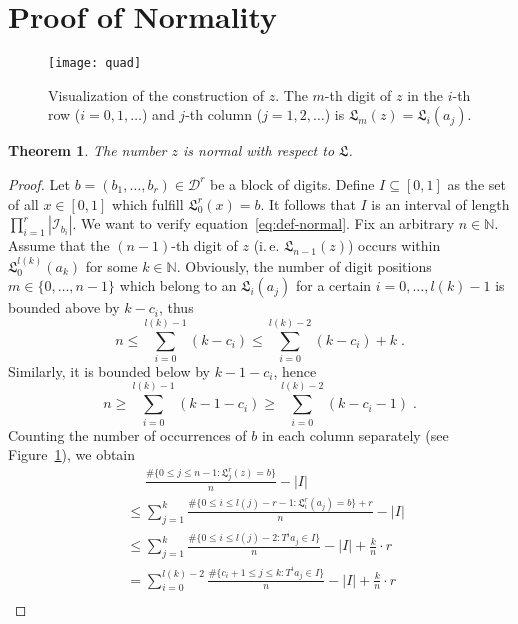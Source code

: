\documentclass{amsart}
\newtheorem{theorem}{Theorem}
\theoremstyle{definition}
\theoremstyle{remark}
\begin{document}
\section{Proof of Normality}\label{sect:proof}
\begin{figure}
\centering\texttt{[image: quad]}
\caption{Visualization of the construction of $z$. The $m$-th digit of $z$ in the $i$-th row ($i=0,1,\dots$) and $j$-th column ($j=1,2,\dots$) is ${\ensuremath{\mathfrak L}}_m(z)={\ensuremath{\mathfrak L}}_i(a_j)$.}\label{fig:quad}
\end{figure}
\begin{theorem}
The number $z$ is normal with respect to ${\ensuremath{\mathfrak L}}$.
\end{theorem}
\begin{proof}
Let $b=(b_1,\dots,b_r)\in{\ensuremath{\mathcal D}}^r$ be a block of digits.
Define $I\subseteq[0,1]$ as the set of all $x\in[0,1]$ which fulfill ${\ensuremath{\mathfrak L}}_0^r(x)=b$. It follows that $I$ is an interval of length $\prod_{i=1}^r|{\ensuremath{\mathcal I}}_{b_i}|$.
We want to verify equation~\eqref{eq:def-normal}.
Fix an arbitrary $n\in{\ensuremath{\mathbb N}}$.
Assume that the $(n-1)$-th digit of $z$ (i.\,e. ${\ensuremath{\mathfrak L}}_{n-1}(z)$) occurs within
${\ensuremath{\mathfrak L}}_0^{l(k)}(a_k)$ for some $k\in{\ensuremath{\mathbb N}}$.
Obviously, the number of digit positions $m\in\{0,\dots,n-1\}$ which belong
to an ${\ensuremath{\mathfrak L}}_i(a_j)$ for a certain $i=0,\dots,l(k)-1$ is bounded above
by $k-c_i$, thus
\begin{equation}
n \le \sum_{i=0}^{l(k)-1}(k-c_i) \le \sum_{i=0}^{l(k)-2}(k-c_i)+k \;. \label{eq:n-le}
\end{equation}
Similarly, it is bounded below by $k-1-c_i$, hence
\begin{equation}
n \ge \sum_{i=0}^{l(k)-1}(k-1-c_i) \ge \sum_{i=0}^{l(k)-2}(k-c_i-1) \label{eq:n-ge} \;.
\end{equation}
Counting the number of occurrences of $b$ in each column separately (see Figure~\ref{fig:quad}), we obtain
\begin{align*}
&\phantom{{}={}} \frac{\#\{0\le j\le n-1:{\ensuremath{\mathfrak L}}_j^r(z)=b\}}n-|I| \\
&\le \sum_{j=1}^k\frac{\#\{0\le i\le l(j)-r-1:{\ensuremath{\mathfrak L}}_i^r(a_j)=b\}+r}n-|I| \\
&\le \sum_{j=1}^k\frac{\#\{0\le i\le l(j)-2:T^ia_j\in I\}}n-|I|+\frac kn\cdot r \\
&= \sum_{i=0}^{l(k)-2}\frac{\#\{c_i+1\le j\le k:T^ia_j\in I\}}n-|I|+\frac kn\cdot r \\

\end{align*}
\end{proof}
\end{document}
